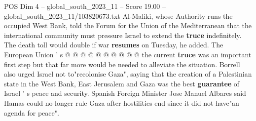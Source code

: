 \begin{textsample}{POS Dim 4 – global\_south\_2023\_11 – Score 19.00 – global\_south\_2023\_11/103820673.txt}
Al-Maliki, whose Authority runs the occupied West Bank, told the Forum for the Union of the Mediterranean that the international community must pressure Israel to extend the \textbf{truce} indefinitely.
The death toll would double if war \textbf{resumes} on Tuesday, he added.
The European Union ' s @ @ @ @ @ @ @ @ @ @ the current \textbf{truce} was an important first step but that far more would be needed to alleviate the situation.
Borrell also urged Israel not to"recolonise Gaza", saying that the creation of a Palestinian state in the West Bank, East Jerusalem and Gaza was the best \textbf{guarantee} of Israel ' s peace and security.
Spanish Foreign Minister Jose Manuel Albares said Hamas could no longer rule Gaza after hostilities end since it did not have"an agenda for peace".

\end{textsample}
